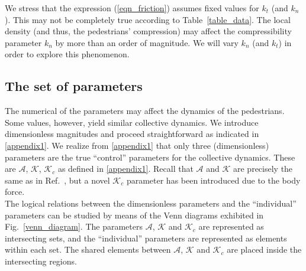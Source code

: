 \documentclass[preprint,12pt]{elsarticle}
\begin{document}
We stress that the expression (\ref{eqn_friction}) assumes fixed values for
$k_t$ (and $k_n$). This may not be completely true according to
Table~\ref{table_data}. The local density (and thus, the pedestrians'
compression) may affect the compressibility parameter $k_n$ by more than an
order  of magnitude. We will vary $k_n$ (and $k_t$) in order to explore this
phenomenon. \\


\subsection{\label{parameters}The set of parameters}

The numerical of the parameters may affect the dynamics of the  pedestrians.
Some values, however, yield similar collective dynamics. We introduce
dimensionless magnitudes  and proceed straightforward as indicated in
\ref{appendix1}. We realize from  \ref{appendix1} that only three
(dimensionless) parameters  are the true  ``control'' parameters for the
collective dynamics. These are $\mathcal{A}$,  $\mathcal{K}$, $\mathcal{K}_c$ as
defined in \ref{appendix1}. Recall that  $\mathcal{A}$ and $\mathcal{K}$ are
precisely the same as in  Ref.~\cite{dorso_2019}, but a novel $\mathcal{K}_c$
parameter has been  introduced due to the body force.   \\

The logical relations between the dimensionless parameters and the
``individual''  parameters can be studied by means of the Venn diagrams
exhibited in  Fig.~\ref{venn_diagram}. The parameters $\mathcal{A}$,
$\mathcal{K}$ and  $\mathcal{K}_c$ are represented as intersecting sets, and the
``individual''  parameters are represented as elements within each set. The
shared elements  between $\mathcal{A}$, $\mathcal{K}$ and $\mathcal{K}_c$ are
placed inside the  intersecting regions. \\
\end{document}

